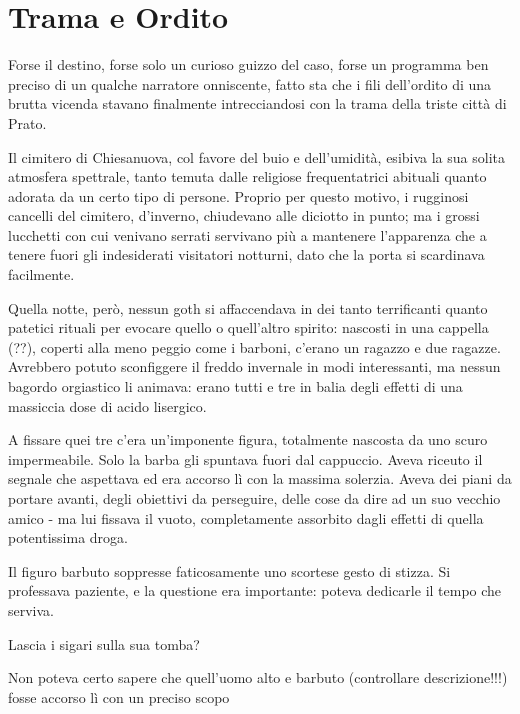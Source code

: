 \chapter{Trama e Ordito}


Forse il destino, forse solo un curioso guizzo del caso, forse un programma ben preciso di un qualche narratore onniscente, fatto sta che i fili dell'ordito di una brutta vicenda stavano finalmente intrecciandosi con la trama della triste città di Prato.

Il cimitero di Chiesanuova, col favore del buio e dell'umidità, esibiva la sua solita atmosfera spettrale, tanto temuta dalle religiose frequentatrici abituali quanto adorata da un certo tipo di persone. Proprio per questo motivo, i rugginosi cancelli del cimitero, d'inverno, chiudevano alle diciotto in punto; ma i grossi lucchetti con cui venivano serrati servivano più a mantenere l'apparenza che a tenere fuori gli indesiderati visitatori notturni, dato che la porta si scardinava facilmente.

Quella notte, però, nessun goth si affaccendava in dei tanto terrificanti quanto patetici rituali per evocare quello o quell'altro spirito: nascosti in una cappella (??), coperti alla meno peggio come i barboni, c'erano un ragazzo e due ragazze. Avrebbero potuto sconfiggere il freddo invernale in modi interessanti, ma nessun bagordo orgiastico li animava: erano tutti e tre in balia degli effetti di una massiccia dose di acido lisergico.

A fissare quei tre c'era un'imponente figura, totalmente nascosta da uno scuro impermeabile. Solo la barba gli spuntava fuori dal cappuccio. Aveva riceuto il segnale che aspettava ed era accorso lì con la massima solerzia. Aveva dei piani da portare avanti, degli obiettivi da perseguire, delle cose da dire ad un suo vecchio amico - ma lui fissava il vuoto, completamente assorbito dagli effetti di quella potentissima droga.

Il figuro barbuto soppresse faticosamente uno scortese gesto di stizza. Si professava paziente, e la questione era importante: poteva dedicarle il tempo che serviva. 

Lascia i sigari sulla sua tomba?

Non poteva certo sapere che quell'uomo alto e barbuto (controllare descrizione!!!) fosse accorso lì con un preciso scopo

